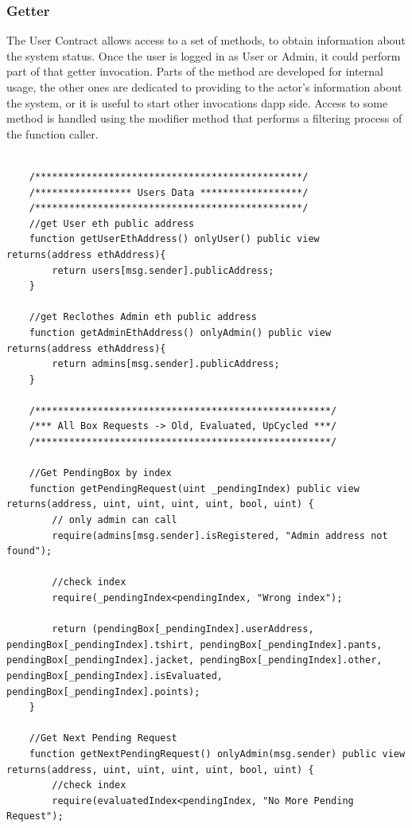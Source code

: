 \subsubsection{Getter}
The User Contract allows access to a set of methods, to obtain information about the system status.
Once the user is logged in as User or Admin, it could perform part of that getter invocation.
Parts of the method are developed for internal usage, the other ones are dedicated to providing to the actor's 
information about the system, or it is useful to start other invocations dapp side. Access to some method is 
handled using the modifier method that performs a filtering process of the function caller. 
\bigskip 

\begin{lstlisting}[language=Solidity]
    
    /***********************************************/
    /***************** Users Data ******************/
    /***********************************************/
    //get User eth public address
    function getUserEthAddress() onlyUser() public view returns(address ethAddress){
        return users[msg.sender].publicAddress;
    }

    //get Reclothes Admin eth public address
    function getAdminEthAddress() onlyAdmin() public view returns(address ethAddress){
        return admins[msg.sender].publicAddress;
    }

    /****************************************************/
    /*** All Box Requests -> Old, Evaluated, UpCycled ***/
    /****************************************************/

    //Get PendingBox by index
    function getPendingRequest(uint _pendingIndex) public view returns(address, uint, uint, uint, uint, bool, uint) {
        // only admin can call
        require(admins[msg.sender].isRegistered, "Admin address not found");

        //check index
        require(_pendingIndex<pendingIndex, "Wrong index");

        return (pendingBox[_pendingIndex].userAddress, pendingBox[_pendingIndex].tshirt, pendingBox[_pendingIndex].pants, pendingBox[_pendingIndex].jacket, pendingBox[_pendingIndex].other, pendingBox[_pendingIndex].isEvaluated, pendingBox[_pendingIndex].points);
    }

    //Get Next Pending Request
    function getNextPendingRequest() onlyAdmin(msg.sender) public view returns(address, uint, uint, uint, uint, bool, uint) {
        //check index
        require(evaluatedIndex<pendingIndex, "No More Pending Request");


\end{lstlisting}
